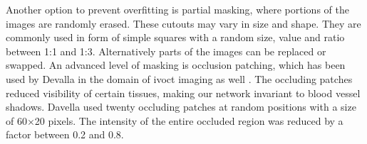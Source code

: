 Another option to prevent \gls{overfitting} is partial masking, where portions of the images are randomly erased. These cutouts may vary in size and shape. They are commonly used in form of simple squares with a random size, value and ratio between 1:1 and 1:3. Alternatively parts of the images can be replaced or swapped. An advanced level of masking is occlusion patching, which has been used by Devalla in the domain of \acrshort{ivoct} imaging as well \cite{Devalla.2018}. The occluding patches reduced visibility of certain tissues, making our network invariant to blood vessel shadows. Davella used twenty occluding patches at random positions with a size of 60×20 pixels. The intensity of the entire occluded region was reduced by a factor between 0.2 and 0.8.